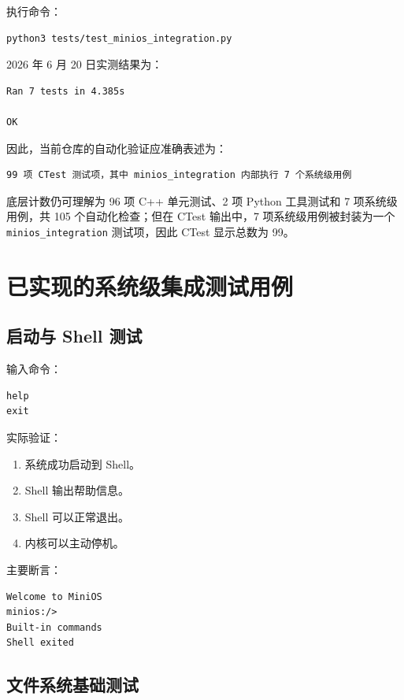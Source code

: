 \documentclass[UTF8,a4paper,12pt,openany,fontset=fandol]{ctexrep}
\begin{document}
执行命令：

\begin{lstlisting}[language=bash]
python3 tests/test_minios_integration.py
\end{lstlisting}

2026 年 6 月 20 日实测结果为：

\begin{lstlisting}
Ran 7 tests in 4.385s

OK
\end{lstlisting}

因此，当前仓库的自动化验证应准确表述为：

\begin{lstlisting}
99 项 CTest 测试项，其中 minios_integration 内部执行 7 个系统级用例
\end{lstlisting}

底层计数仍可理解为 96 项 C++ 单元测试、2 项 Python 工具测试和 7 项系统级用例，共 105 个自动化检查；但在 CTest 输出中，7 项系统级用例被封装为一个 \nolinkurl{minios_integration} 测试项，因此 CTest 显示总数为 99。

\section{已实现的系统级集成测试用例}

\subsection{启动与 Shell 测试}

输入命令：

\begin{lstlisting}
help
exit
\end{lstlisting}

实际验证：

\begin{enumerate}
\item 系统成功启动到 Shell。
\item Shell 输出帮助信息。
\item Shell 可以正常退出。
\item 内核可以主动停机。
\end{enumerate}

主要断言：

\begin{lstlisting}
Welcome to MiniOS
minios:/>
Built-in commands
Shell exited
\end{lstlisting}

\subsection{文件系统基础测试}
\end{document}
